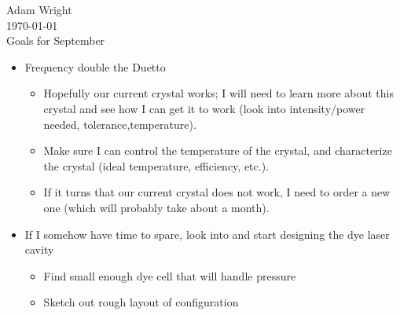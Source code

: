 \documentclass[]{article}
\begin{document}
\noindent Adam Wright\\
\noindent \today\\
\noindent Goals for September\\

\begin{itemize}
  \item Frequency double the Duetto
	\begin{itemize}
	  \item Hopefully our current crystal works; I will need to learn more about this crystal and see how I can get it to work (look into intensity/power needed, tolerance,temperature).
	  \item Make sure I can control the temperature of the crystal, and characterize the crystal (ideal temperature, efficiency, etc.).
	  \item If it turns that our current crystal does not work, I need to order a new one (which will probably take about a month).
	\end{itemize}
  \item If I somehow have time to spare, look into and start designing the dye laser cavity
	\begin{itemize}
	  \item Find small enough dye cell that will handle pressure
	  \item Sketch out rough layout of configuration
	\end{itemize}
\end{itemize}
\end{document}
